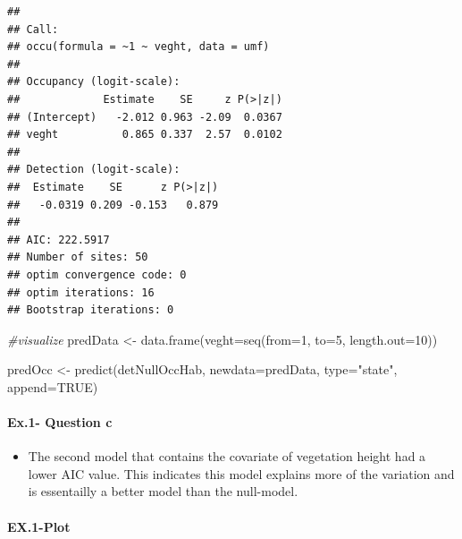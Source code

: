 \documentclass[
]{article}
\newenvironment{Shaded}{\begin{snugshade}}{\end{snugshade}}
\newcommand{\AttributeTok}[1]{\textcolor[rgb]{0.77,0.63,0.00}{#1}}
\newcommand{\CommentTok}[1]{\textcolor[rgb]{0.56,0.35,0.01}{\textit{#1}}}
\newcommand{\ConstantTok}[1]{\textcolor[rgb]{0.00,0.00,0.00}{#1}}
\newcommand{\DecValTok}[1]{\textcolor[rgb]{0.00,0.00,0.81}{#1}}
\newcommand{\FunctionTok}[1]{\textcolor[rgb]{0.00,0.00,0.00}{#1}}
\newcommand{\NormalTok}[1]{#1}
\newcommand{\OtherTok}[1]{\textcolor[rgb]{0.56,0.35,0.01}{#1}}
\newcommand{\StringTok}[1]{\textcolor[rgb]{0.31,0.60,0.02}{#1}}
\providecommand{\tightlist}{%
  \setlength{\itemsep}{0pt}\setlength{\parskip}{0pt}}
\begin{document}
\begin{verbatim}
## 
## Call:
## occu(formula = ~1 ~ veght, data = umf)
## 
## Occupancy (logit-scale):
##             Estimate    SE     z P(>|z|)
## (Intercept)   -2.012 0.963 -2.09  0.0367
## veght          0.865 0.337  2.57  0.0102
## 
## Detection (logit-scale):
##  Estimate    SE      z P(>|z|)
##   -0.0319 0.209 -0.153   0.879
## 
## AIC: 222.5917 
## Number of sites: 50
## optim convergence code: 0
## optim iterations: 16 
## Bootstrap iterations: 0
\end{verbatim}

\begin{Shaded}
\begin{Highlighting}[]
\CommentTok{\#visualize}
\NormalTok{predData }\OtherTok{\textless{}{-}} \FunctionTok{data.frame}\NormalTok{(}\AttributeTok{veght=}\FunctionTok{seq}\NormalTok{(}\AttributeTok{from=}\DecValTok{1}\NormalTok{, }\AttributeTok{to=}\DecValTok{5}\NormalTok{, }\AttributeTok{length.out=}\DecValTok{10}\NormalTok{))}

\NormalTok{predOcc }\OtherTok{\textless{}{-}} \FunctionTok{predict}\NormalTok{(detNullOccHab, }\AttributeTok{newdata=}\NormalTok{predData,}
                   \AttributeTok{type=}\StringTok{"state"}\NormalTok{, }\AttributeTok{append=}\ConstantTok{TRUE}\NormalTok{)}
\end{Highlighting}
\end{Shaded}

\hypertarget{ex.1--question-c}{%
\paragraph{\texorpdfstring{\textbf{Ex.1- Question c
}}{Ex.1- Question c }}\label{ex.1--question-c}}

\begin{itemize}
\tightlist
\item
  The second model that contains the covariate of vegetation height had
  a lower AIC value. This indicates this model explains more of the
  variation and is essentailly a better model than the null-model.
\end{itemize}

\hypertarget{ex.1-plot}{%
\paragraph{\texorpdfstring{\textbf{EX.1-Plot}}{EX.1-Plot}}\label{ex.1-plot}}
\end{document}
